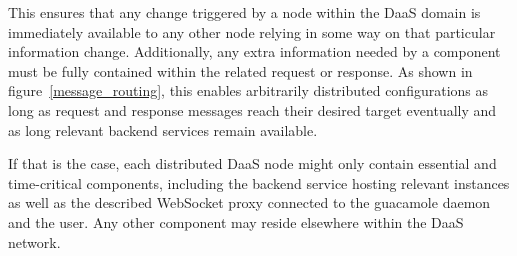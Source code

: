 \documentclass[runningheads]{llncs}
\begin{document}
This ensures that any change triggered by a node within the DaaS domain
is immediately available to any other node relying in some way
on that particular information change.
Additionally, any extra information needed by a component must be fully contained
within the related request or response.
As shown in figure~\ref{message_routing}, this enables arbitrarily distributed configurations as long as request
and response messages reach their desired target eventually
and as long relevant backend services remain available.

If that is the case, each distributed DaaS node might only contain essential and time-critical components,
including the backend service hosting relevant instances as well as the described
WebSocket proxy connected to the guacamole daemon and the user.
Any other component may reside elsewhere within the DaaS network.
\end{document}
